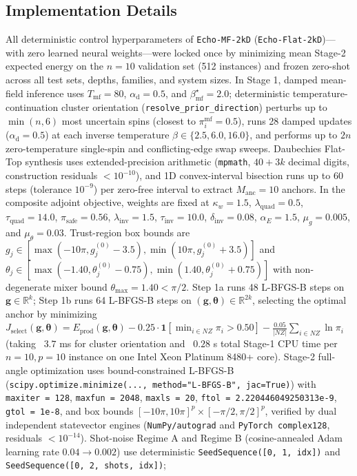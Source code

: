 \documentclass[10pt,a4paper]{article}
\begin{document}
\subsection*{Implementation Details}

All deterministic control hyperparameters of \texttt{Echo-MF-2kD} (\texttt{Echo-Flat-2kD})---with zero learned neural weights---were locked once by minimizing mean Stage-2 expected energy on the $n = 10$ validation set (512 instances) and frozen zero-shot across all test sets, depths, families, and system sizes. In Stage 1, damped mean-field inference uses $T_{\mathrm{mf}} = 80$, $\alpha_{\mathrm{d}} = 0.5$, and $\beta_{\mathrm{mf}}^\star = 2.0$; deterministic temperature-continuation cluster orientation (\texttt{resolve\_\allowbreak{}prior\_\allowbreak{}direction}) perturbs up to $\min(n, 6)$ most uncertain spins (closest to $\pi_i^{\mathrm{mf}} = 0.5$), runs 28 damped updates ($\alpha_{\mathrm{d}} = 0.5$) at each inverse temperature $\beta \in \{2.5, 6.0, 16.0\}$, and performs up to $2n$ zero-temperature single-spin and conflicting-edge swap sweeps. Daubechies Flat-Top synthesis uses extended-precision arithmetic (\texttt{mpmath}, $40 + 3k$ decimal digits, construction residuals $< 10^{-10}$), and 1D convex-interval bisection runs up to 60 steps (tolerance $10^{-9}$) per zero-free interval to extract $M_{\mathrm{anc}} = 10$ anchors. In the composite adjoint objective, weights are fixed at $\kappa_w = 1.5$, $\lambda_{\mathrm{quad}} = 0.5$, $\tau_{\mathrm{quad}} = 14.0$, $\pi_{\mathrm{safe}} = 0.56$, $\lambda_{\mathrm{inv}} = 1.5$, $\tau_{\mathrm{inv}} = 10.0$, $\delta_{\mathrm{inv}} = 0.08$, $\alpha_E = 1.5$, $\mu_g = 0.005$, and $\mu_\theta = 0.03$. Trust-region box bounds are $g_j \in [\max(-10\pi, g_j^{(0)} - 3.5), \min(10\pi, g_j^{(0)} + 3.5)]$ and $\theta_j \in [\max(-1.40, \theta_j^{(0)} - 0.75), \min(1.40, \theta_j^{(0)} + 0.75)]$ with non-degenerate mixer bound $\theta_{\max} = 1.40 < \pi/2$. Step 1a runs 48 L-BFGS-B steps on $\boldsymbol{g} \in \mathbb{R}^k$; Step 1b runs 64 L-BFGS-B steps on $(\boldsymbol{g}, \boldsymbol{\theta}) \in \mathbb{R}^{2k}$, selecting the optimal anchor by minimizing $J_{\mathrm{select}}(\boldsymbol{g}, \boldsymbol{\theta}) = E_{\mathrm{prod}}(\boldsymbol{g}, \boldsymbol{\theta}) - 0.25 \cdot \mathbf{1}[\min_{i \in NZ}\pi_i > 0.50] - \frac{0.05}{|NZ|}\sum_{i \in NZ}\ln\pi_i$ (taking ~$3.7$ ms for cluster orientation and ~$0.28$ s total Stage-1 CPU time per $n=10, p=10$ instance on one Intel Xeon Platinum 8480+ core). Stage-2 full-angle optimization uses bound-constrained L-BFGS-B \citep{byrd1995limited} (\texttt{scipy.optimize.minimize(...,\allowbreak\ method="L-BFGS-B",\allowbreak\ jac=True)}) with \texttt{maxiter = 128}, \texttt{maxfun = 2048}, \texttt{maxls = 20}, \texttt{ftol = 2.220446049250313e-9}, \texttt{gtol = 1e-8}, and box bounds $[-10\pi, 10\pi]^p \times [-\pi/2, \pi/2]^p$, verified by dual independent statevector engines (\texttt{NumPy/\allowbreak{}autograd} and \texttt{PyTorch complex128}, residuals $< 10^{-14}$). Shot-noise Regime A and Regime B (cosine-annealed Adam learning rate $0.04 \to 0.002$) use deterministic \texttt{SeedSequence([0,\allowbreak\ 1,\allowbreak\ idx])} and \texttt{SeedSequence([0,\allowbreak\ 2,\allowbreak\ shots,\allowbreak\ idx])}; 
\end{document}
